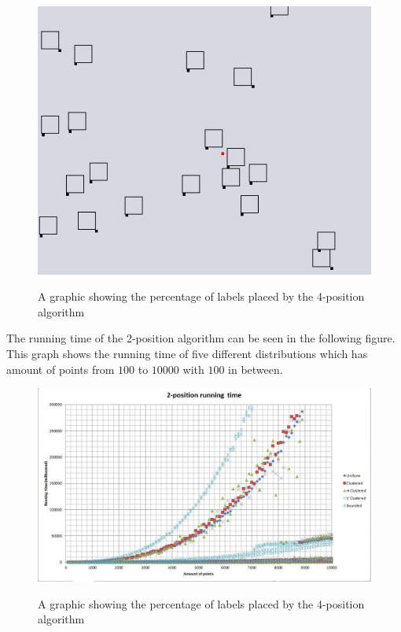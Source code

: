 \documentclass[crop=false,a4paper,oneside,11pt]{standalone}
\begin{document}
\begin{figure}[h!]
\centering
  \includegraphics[scale = 0.5]{2pos_example.JPG}\\
  \caption{A graphic showing the percentage of labels placed by the 4-position algorithm}
 \end{figure}

The running time of the 2-position algorithm can be seen in the following figure. This graph shows the running time of five different distributions which has amount of points from $100$ to $10000$ with $100$ in between.
\begin{figure}[h!]
 \centering
  \includegraphics[scale = 0.5]{2PosRunningTime.JPG}\\
  \caption{A graphic showing the percentage of labels placed by the 4-position algorithm}
 \end{figure}  
\end{document}
